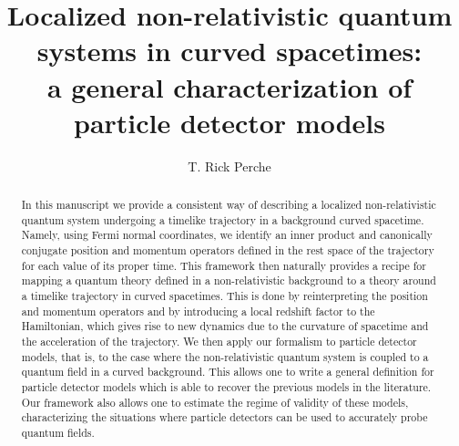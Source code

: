 \documentclass[prd,twocolumn,superscriptaddress,floatfix,amsmath,amssymb,amsfonts,longbibliography,nofootinbib]{revtex4-1}
\begin{document}
\title{Localized non-relativistic quantum systems in curved spacetimes: \\
a general characterization of particle detector models}


\author{T. Rick Perche}





\begin{abstract}
    In this manuscript we provide a consistent way of describing a localized non-relativistic quantum system undergoing a timelike trajectory in a background curved spacetime. Namely, using Fermi normal coordinates, we identify an inner product and canonically conjugate position and momentum operators defined in the rest space of the trajectory for each value of its proper time. This framework then naturally provides a recipe for mapping a quantum theory defined in a non-relativistic background to a theory around a timelike trajectory in curved spacetimes. This is done by reinterpreting the position and momentum operators and by introducing a local redshift factor to the Hamiltonian, which gives rise to new dynamics due to the curvature of spacetime and the acceleration of the trajectory. We then apply our formalism to particle detector models, that is, to the case where the non-relativistic quantum system is coupled to a quantum field in a curved background. This allows one to write a general definition for particle detector models which is able to recover the previous models in the literature. Our framework also allows one to estimate the regime of validity of these models, characterizing the situations where particle detectors can be used to accurately probe quantum fields.
\end{abstract}
\end{document}
